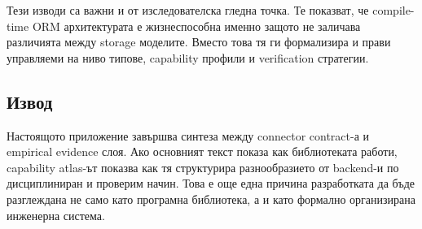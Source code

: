 Тези изводи са важни и от изследователска гледна точка. Те показват, че compile-time ORM архитектурата е жизнеспособна именно защото не заличава различията между storage моделите. Вместо това тя ги формализира и прави управляеми на ниво типове, capability профили и verification стратегии.

\subsection{Извод}

Настоящото приложение завършва синтеза между connector contract-а и empirical evidence слоя. Ако основният текст показа как библиотеката работи, capability atlas-ът показва как тя структурира разнообразието от backend-и по дисциплиниран и проверим начин. Това е още една причина разработката да бъде разглеждана не само като програмна библиотека, а и като формално организирана инженерна система.
